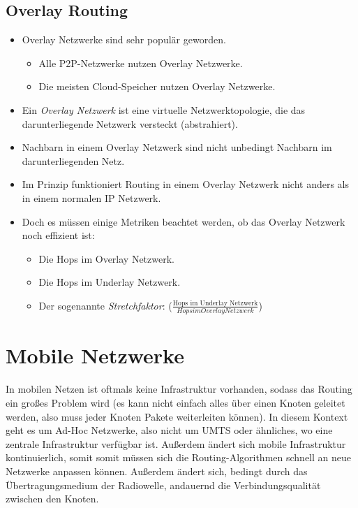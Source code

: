 	\section{Overlay Routing}
		\begin{itemize}
			\item Overlay Netzwerke sind sehr populär geworden.
				\begin{itemize}
					\item Alle P2P-Netzwerke nutzen Overlay Netzwerke.
					\item Die meisten Cloud-Speicher nutzen Overlay Netzwerke.
				\end{itemize}
			\item Ein \textit{Overlay Netzwerk} ist eine virtuelle Netzwerktopologie, die das darunterliegende Netzwerk versteckt (abstrahiert).
			\item Nachbarn in einem Overlay Netzwerk sind nicht unbedingt Nachbarn im darunterliegenden Netz.
			\item Im Prinzip funktioniert Routing in einem Overlay Netzwerk nicht anders als in einem normalen IP Netzwerk.
			\item Doch es müssen einige Metriken beachtet werden, ob das Overlay Netzwerk noch effizient ist:
				\begin{itemize}
					\item Die Hops im Overlay Netzwerk.
					\item Die Hops im Underlay Netzwerk.
					\item Der sogenannte \textit{Stretchfaktor}: (\( \frac{\text{Hops im Underlay Netzwerk}}{Hops im Overlay Netzwerk} \))
				\end{itemize}
		\end{itemize}

\chapter{Mobile Netzwerke}
	\label{c:mobilenetworks}

	In mobilen Netzen ist oftmals keine Infrastruktur vorhanden, sodass das Routing ein großes Problem wird (es kann nicht einfach alles über einen Knoten geleitet werden, also muss jeder Knoten Pakete weiterleiten können). In diesem Kontext geht es um Ad-Hoc Netzwerke, also nicht um UMTS oder ähnliches, wo eine zentrale Infrastruktur verfügbar ist. Außerdem ändert sich mobile Infrastruktur kontinuierlich, somit somit müssen sich die Routing-Algorithmen schnell an neue Netzwerke anpassen können. Außerdem ändert sich, bedingt durch das Übertragungsmedium der Radiowelle, andauernd die Verbindungsqualität zwischen den Knoten.

